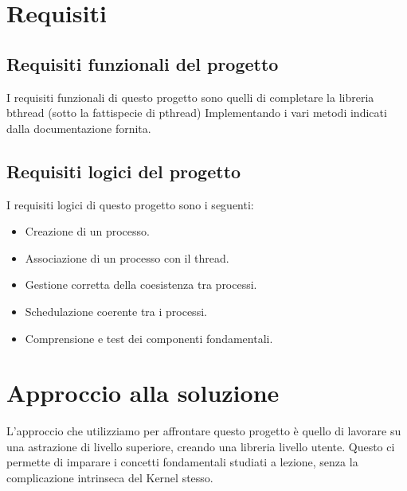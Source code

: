\documentclass{article}
\begin{document}
\section{Requisiti}
\vspace{5mm}

\subsection{Requisiti funzionali del progetto}
\vspace{2mm}

I requisiti funzionali di questo progetto sono quelli di completare la libreria bthread (sotto la fattispecie di pthread) Implementando i vari metodi indicati dalla documentazione fornita.

\subsection{Requisiti logici del progetto}
\vspace{2mm}

I requisiti logici di questo progetto sono i seguenti:
\begin{itemize}
    \item Creazione di un processo.
    \item Associazione di un processo con il thread.
    \item Gestione corretta della coesistenza tra processi.
    \item Schedulazione coerente tra i processi.
    \item Comprensione e test dei componenti fondamentali.
\end{itemize}



\section{Approccio alla soluzione}
\vspace{5mm}
L'approccio che utilizziamo per affrontare questo progetto è quello di lavorare su una astrazione di livello superiore, creando una libreria livello utente. Questo ci permette di imparare i concetti fondamentali studiati a lezione, senza la complicazione intrinseca del Kernel stesso.
\end{document}

